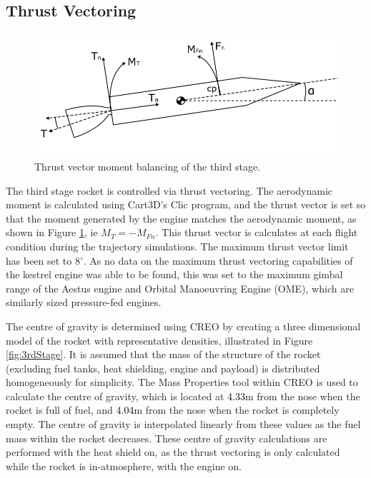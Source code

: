 		\subsection{Thrust Vectoring}\label{sec:thrustvectoring}
		\begin{figure}[ht]
			\centering
			\includegraphics[width=0.7\linewidth]{figures/3_vehicle_design/ThrustVec}
			\caption{Thrust vector moment balancing of the third stage.}
			\label{fig:ThrustVec}
		\end{figure}
		The third stage rocket is controlled via thrust vectoring. The aerodynamic moment is calculated using Cart3D's Clic program, and the thrust vector is set so that the moment generated by the engine matches the aerodynamic moment, as shown in Figure \ref{fig:ThrustVec}, ie $M_{T} = -M_{Fn}$. This thrust vector is calculates at each flight condition during the trajectory simulations. The maximum thrust vector limit has been set to 8$^\circ$. As no data on the maximum thrust vectoring capabilities of the kestrel engine was able to be found, this was set to the maximum gimbal range of the Aestus engine and Orbital Manoeuvring Engine (OME), which are similarly sized pressure-fed engines\cite{Wade2017}.
		
		The centre of gravity is determined using CREO by creating a three dimensional model of the rocket with representative densities, illustrated in Figure \ref{fig:3rdStage}. It is assumed that the mass of the structure of the rocket (excluding fuel tanks, heat shielding, engine and payload) is distributed homogeneously for simplicity. The Mass Properties tool within CREO is used to calculate the centre of gravity, which is located at \textcolor{black}{4.33}m from the nose when the rocket is full of fuel, and \textcolor{black}{4.04}m from the nose when the rocket is completely empty. The centre of gravity is interpolated linearly from these values as the fuel mass within the rocket decreases. These centre of gravity calculations are performed with the heat shield on, as the thrust vectoring is only calculated while the rocket is in-atmosphere, with the engine on. 
		
	
		

